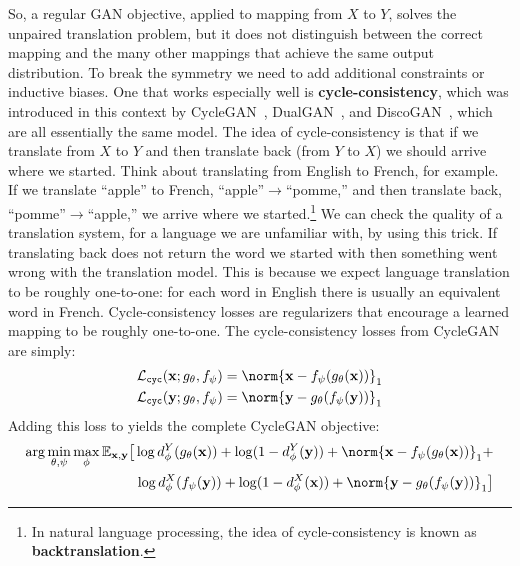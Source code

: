So, a regular GAN objective, applied to mapping from $X$ to $Y$, solves the unpaired translation problem, but it does not distinguish between the correct mapping and the many other mappings that achieve the same output distribution. To break the symmetry we need to add additional constraints or inductive biases. One that works especially well is \textbf{cycle-consistency}, which was introduced in this context by CycleGAN~\cite{CycleGAN2017}, DualGAN~\cite{yi2017dualgan}, and DiscoGAN~\cite{kim2017learning}, which are all essentially the same model. The idea of cycle-consistency is that if we translate from $X$ to $Y$ and then translate back (from $Y$ to $X$) we should arrive where we started. Think about translating from English to French, for example. If we translate ``apple'' to French, ``apple''$\rightarrow$``pomme,'' and then translate back, ``pomme''$\rightarrow$``apple,'' we arrive where we started.\footnote{In natural language processing, the idea of cycle-consistency is known as \textbf{backtranslation}.} We can check the quality of a translation system, for a language we are unfamiliar with, by using this trick. If translating back does not return the word we started with then something went wrong with the translation model. This is because we expect language translation to be roughly one-to-one: for each word in English there is usually an equivalent word in French. Cycle-consistency losses are regularizers that encourage a learned mapping to be roughly one-to-one. The cycle-consistency losses from CycleGAN are simply:
\begin{align}
    \mathcal{L}_{\texttt{cyc}}(\mathbf{x};g_{\theta},f_{\psi}) & = \norm{\mathbf{x} - f_{\psi}(g_{\theta}(\mathbf{x}))}_1 \\
    \mathcal{L}_{\texttt{cyc}}(\mathbf{y};g_{\theta},f_{\psi}) & = \norm{\mathbf{y} - g_{\theta}(f_{\psi}(\mathbf{y}))}_1
\end{align}
Adding this loss to \eqn{\ref{eqn:conditional_generative_models:x_to_y_GAN_learning_problem}} yields the complete CycleGAN objective:
\begin{align}
    \arg\min_{\theta,\psi}\max_{\phi} \mathbb{E}_{\mathbf{x},\mathbf{y}} \big[ \log d_{\phi}^{Y}(g_{\theta}(\mathbf{x})) + \log (1 - d_{\phi}^{Y}(\mathbf{y})) + \norm{\mathbf{x} - f_{\psi}(g_{\theta}(\mathbf{x}))}_1 + \\
        \log d_{\phi}^{X}(f_{\psi}(\mathbf{y})) + \log (1 - d_{\phi}^{X}(\mathbf{x})) + \norm{\mathbf{y} - g_{\theta}(f_{\psi}(\mathbf{y}))}_1 \big]
\end{align}
